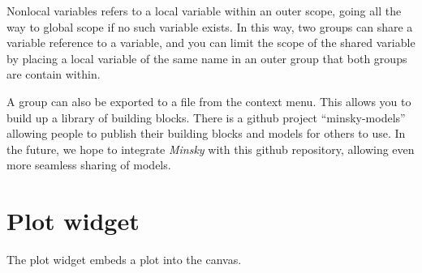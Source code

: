 Nonlocal variables refers to a local variable within an outer scope,
going all the way to global scope if no such variable exists. In this
way, two groups can share a variable reference to a variable, and
you can limit the scope of the shared variable by placing a local
variable of the same name in an outer group that both groups are contain
within.

A group can also be exported to a file from the context menu. This
allows you to build up a library of building blocks. There is a github
project ``minsky-models'' allowing people to publish their building
blocks and models for others to use. In the future, we hope to integrate
\emph{Minsky} with this github repository, allowing even more seamless
sharing of models.

\section{Plot widget}

\label{PlotWidget}


The plot widget embeds a plot into the canvas.

